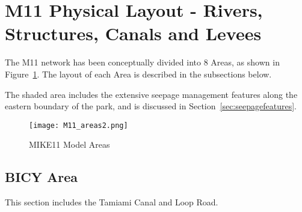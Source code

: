 




\graphicspath{{../figs/}{../../../../../../ENP_FILES/LATEX/figs-not-in-git}} %


\pagestyle{sfnrctech1}


\setcounter{page}{1}  %

\begingroup
\sffamily
\tableofcontents
\endgroup
\cleardoublepage


\normalsize

\section{M11 Physical Layout - Rivers, Structures, Canals and Levees}


The M11 network has been conceptually divided into 8 Areas, as shown in Figure~\ref{fig:M11_areas}. The layout of each Area is described in the subsections below.

The shaded area includes the extensive seepage management features along the eastern boundary of the park, and is discussed in Section~\ref{sec:seepagefeatures}.

\begin{figure}[!h]
  \begin{center}
  \texttt{[image: M11\_areas2.png]}
  \caption[MIKE11 Model Areas]{MIKE11 Model Areas}
  \label{fig:M11_areas}
  \end{center}
\end{figure}

\clearpage

\subsection{BICY Area}
This section includes the Tamiami Canal and Loop Road.


